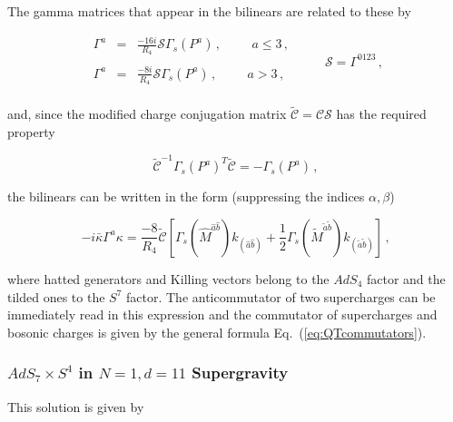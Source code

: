 \documentclass[12pt,a4paper]{article}
\begin{document}
The gamma matrices that appear in the bilinears are related to these by

\begin{equation}
  \begin{array}{rcl}
\Gamma^{a} & = & {\textstyle\frac{-16i}{R_{4}}}
\mathcal{S}\Gamma_{s}(P^{a})\, ,\hspace{1cm}a\leq 3\, ,\\
& & \\
\Gamma^{a} & = & {\textstyle\frac{-8i}{R_{4}}}
\mathcal{S}\Gamma_{s}(P^{a})\, ,\hspace{1cm}a> 3\, ,\\
  \end{array}
\hspace{1cm}
\mathcal{S}=\Gamma^{0123}\, ,
\end{equation}

\noindent
and, since the modified charge conjugation matrix $\tilde{\mathcal{C}}
=\mathcal{C}\mathcal{S}$ has the required property

\begin{equation}
\label{eq:property}
\tilde{\mathcal{C}}^{-1}\Gamma_{s}(P^{a})^{T}\tilde{\mathcal{C}} 
= -\Gamma_{s}(P^{a})\, ,
\end{equation}

\noindent
the bilinears can be written in the form (suppressing the indices
$\alpha,\beta$)

\begin{equation}
-i\bar{\kappa}\Gamma^{a}\kappa = {\textstyle\frac{-8}{R_{4}}} 
\tilde{\mathcal{C}}[\Gamma_{s}(\hat{M}^{\hat{a}\hat{b}})k_{(\hat{a}\hat{b})}
+{\textstyle\frac{1}{2}}\Gamma_{s}(\tilde{M}^{\tilde{a}\tilde{b}})
k_{(\tilde{a}\tilde{b})}]\, ,
\end{equation}

\noindent
where hatted generators and Killing vectors belong to the $AdS_{4}$ factor
and the tilded ones to the $S^{7}$ factor. The
anticommutator of two supercharges can be immediately read in this
expression and the commutator of supercharges and bosonic charges is
given by the general formula Eq.~(\ref{eq:QTcommutators}).


\subsubsection{$AdS_{7}\times S^{4}$ in $N=1,d=11$ Supergravity}

This solution is given by
\end{document}
